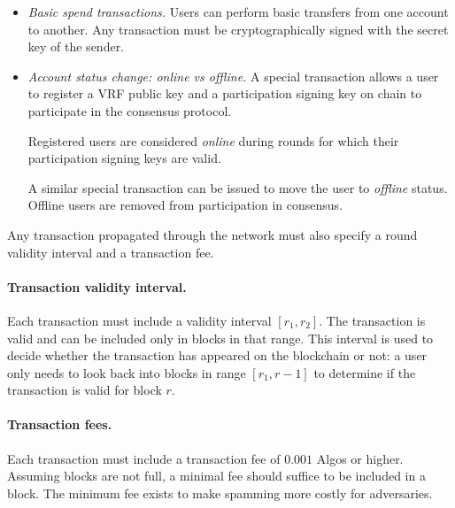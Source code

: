 \documentclass[../main.tex]{subfiles}
\begin{document}
\begin{itemize}
    \item \emph{Basic spend transactions.} Users can perform basic transfers from one account to another. Any transaction must be cryptographically signed with the secret key of the sender. 
    \item \emph{Account status change: \emph{online} vs \emph{offline}.} A special transaction allows a user to register a VRF public key and a participation signing key on chain to participate in the consensus protocol.

    Registered users are considered \emph{online} during rounds for which their participation signing keys are valid. 

    A similar special transaction can be issued to move the user to \emph{offline} status. Offline users are removed from participation in consensus. 
\end{itemize}

Any transaction propagated through the network must also specify a round validity interval and a transaction fee. 

\paragraph{Transaction validity interval.}
Each transaction must include a validity interval $[r_1,r_2]$. The transaction is valid and can be included only in blocks in that range. This interval is used to decide whether the transaction has appeared on the blockchain or not: a user only needs to look back into blocks in range $[r_1, r-1]$ to determine if the transaction is valid for block $r$. 

\paragraph{Transaction fees.}
Each transaction must include a transaction fee of $0.001$ Algos or higher. Assuming blocks are not full, a minimal fee should suffice to be included in a block. The minimum fee exists to make spamming more costly for adversaries.
\end{document}

